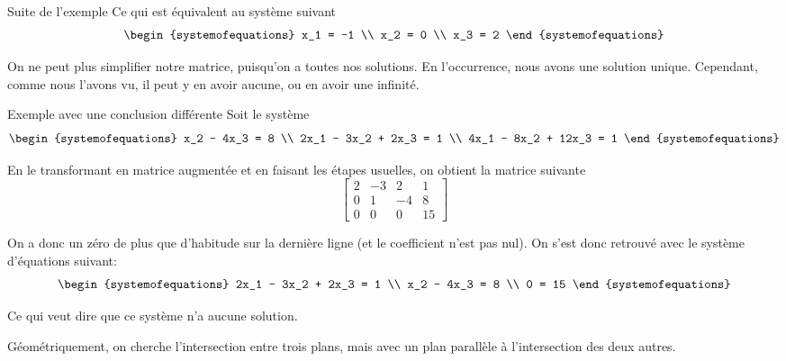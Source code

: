 \documentclass{article}
\begin{document}
\begin{parag}{Suite de l'exemple}
    Ce qui est équivalent au système suivant
    \[\begin{systemofequations}
    x_1 = -1 \\
    x_2 = 0 \\
    x_3 = 2
    \end{systemofequations}\]

    On ne peut plus simplifier notre matrice, puisqu'on a toutes nos solutions. En l'occurrence, nous avons une solution unique. Cependant, comme nous l'avons vu, il peut y en avoir aucune, ou en avoir une infinité.

\end{parag}

\begin{parag}{Exemple avec une conclusion différente}
   Soit le système
   \[\begin{systemofequations}
   x_2 - 4x_3 = 8 \\
   2x_1 - 3x_2 + 2x_3 = 1 \\
   4x_1 - 8x_2 + 12x_3 = 1
   \end{systemofequations}\]

   En le transformant en matrice augmentée et en faisant les étapes usuelles, on obtient la matrice suivante
   \[\begin{bmatrix} 2 & -3 & 2 & 1 \\ 0 & 1 & -4 & 8 \\ 0 & 0 & 0 & 15 \end{bmatrix} \]

   On a donc un zéro de plus que d'habitude sur la dernière ligne (et le coefficient n'est pas nul). On s'est donc retrouvé avec le système d'équations suivant:
  \[\begin{systemofequations}
  2x_1 - 3x_2 + 2x_3 = 1 \\
  x_2 - 4x_3 = 8 \\
  0 = 15
  \end{systemofequations}\]

  Ce qui veut dire que ce système n'a aucune solution.

  Géométriquement, on cherche l'intersection entre trois plans, mais avec un plan parallèle à l'intersection des deux autres.
\end{parag}
\end{document}
